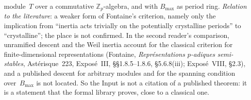 \documentclass[11pt,a4paper]{article}
\theoremstyle{plainx}
\theoremstyle{uprightx}
\providecommand{\Zp}{\mathbb{Z}_p}\providecommand{\Qp}{\mathbb{Q}_p}\providecommand{\GQp}{G_{\mathbb{Q}_p}}
\begin{document}
{\begin{enumerate}[label=\textup{K\arabic*.},ref=K\arabic*,leftmargin=2.8em,itemsep=2.5pt]
module~$T$ over a commutative $\Zp$-algebra, and with $B_{\max}$ as period ring. \emph{Relation to the
literature}: a weaker form of Fontaine's criterion, namely only the implication from ``inertia acts trivially
on the potentially crystalline periods'' to ``crystalline''; the place is not confirmed. In the second
reader's comparison, unramified descent and the Weil inertia account for the classical criterion for
finite-dimensional representations (Fontaine, \emph{Représentations $p$-adiques semi-stables},
Astérisque~223, Exposé~III, §§1.8.5--1.8.6, §5.6.8(iii); Exposé~VIII, §2.3), and a published descent for
arbitrary modules and for the spanning condition over~$B_{\max}$ is not located. So the Input is not a
citation of a published theorem: it is a statement that the formal library proves, close to a classical one.
\end{enumerate}}
\end{document}

